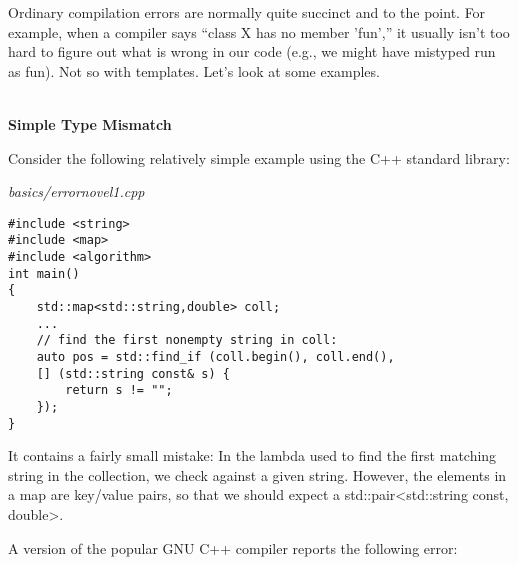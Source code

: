 Ordinary compilation errors are normally quite succinct and to the point. For example, when a compiler says “class X has no member ’fun’,” it usually isn’t too hard to figure out what is wrong in our code (e.g., we might have mistyped run as fun). Not so with templates. Let’s look at some examples.

\hspace*{\fill} \\ %
\noindent
\textbf{Simple Type Mismatch}

Consider the following relatively simple example using the C++ standard library:

\noindent
\textit{basics/errornovel1.cpp}
\begin{lstlisting}[style=styleCXX]
#include <string>
#include <map>
#include <algorithm>
int main()
{
	std::map<std::string,double> coll;
	...
	// find the first nonempty string in coll:
	auto pos = std::find_if (coll.begin(), coll.end(),
	[] (std::string const& s) {
		return s != "";
	});
}
\end{lstlisting}

It contains a fairly small mistake: In the lambda used to find the first matching string in the collection, we check against a given string. However, the elements in a map are key/value pairs, so that we should expect a std::pair<std::string const, double>.

A version of the popular GNU C++ compiler reports the following error:

